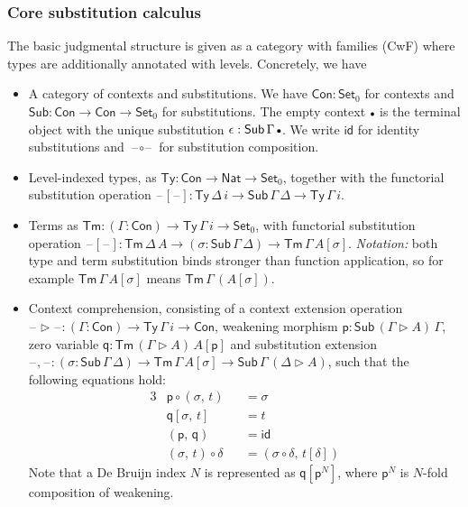 \documentclass[acmsmall,screen,review,anonymous]{acmart}
\newcommand{\msf}[1]{{\mathsf{#1}}}
\newcommand{\p}{\mathsf{p}}
\newcommand{\q}{\mathsf{q}}
\newcommand{\Set}{\msf{Set}}
\newcommand{\Nat}{\msf{Nat}}
\newcommand{\blank}{{\mathord{\hspace{1pt}\text{--}\hspace{1pt}}}}
\newcommand{\emptycon}{\scaleobj{.75}\bullet}
\newcommand{\id}{\msf{id}}
\newcommand{\Con}{\msf{Con}}
\newcommand{\Sub}{\msf{Sub}}
\newcommand{\Ty}{\msf{Ty}}
\newcommand{\Tm}{\msf{Tm}}
\newcommand{\ext}{\triangleright}
\begin{document}
\subsubsection{Core substitution calculus} The basic judgmental structure is given
as a category with families (CwF) \cite{TODO} where types are additionally annotated with levels.
Concretely, we have
\begin{itemize}
\item A category of contexts and substitutions. We have $\Con : \Set_0$ for contexts and $\Sub : \Con \to \Con \to \Set_0$
  for substitutions. The empty context $\emptycon$ is the terminal object with the unique substitution $\epsilon : \Sub\,\Gamma\,\emptycon$.
  We write $\id$ for identity substitutions and $\blank\!\circ\!\blank$ for substitution composition.
\item Level-indexed types, as $\Ty : \Con \to \Nat \to \Set_0$, together with the functorial substitution operation
      $\blank[\blank] : \Ty\,\Delta\,i \to \Sub\,\Gamma\,\Delta \to \Ty\,\Gamma\,i$.
\item Terms as $\Tm : (\Gamma : \Con) \to \Ty\,\Gamma\,i \to \Set_0$, with functorial substitution operation
  $\blank[\blank] : \Tm\,\Delta\,A \to (\sigma : \Sub\,\Gamma\,\Delta) \to \Tm\,\Gamma\,A[\sigma]$.
  \emph{Notation:} both type and term substitution binds stronger than function application, so
  for example $\Tm\,\Gamma\,A[\sigma]$ means $\Tm\,\Gamma\,(A[\sigma])$.
\item Context comprehension, consisting of a context extension operation $\blank\!\ext\!\blank : (\Gamma : \Con) \to \Ty\,\Gamma\,i \to \Con$,
  weakening morphism $\p : \Sub\,(\Gamma\ext A)\,\Gamma$, zero variable $\q : \Tm\,(\Gamma\ext A)\,A[\p]$ and substitution extension $\blank,\!\blank : (\sigma : \Sub\,\Gamma\,\Delta) \to \Tm\,\Gamma\,A[\sigma] \to \Sub\,\Gamma\,(\Delta\ext A)$, such that the following equations hold:
  \begin{alignat*}{3}
    &\p \circ (\sigma,\,t)     &&= \sigma \\
    &\q[\sigma,\,t]            &&= t \\
    &(\p,\,\q)                 &&= \id \\
    &(\sigma,\,t) \circ \delta &&= (\sigma \circ \delta,\,t[\delta])
  \end{alignat*}
  Note that a De Bruijn index $N$ is represented as $\q[\p^N]$, where $\p^N$ is $N$-fold composition
  of weakening.
\end{itemize}
\end{document}
